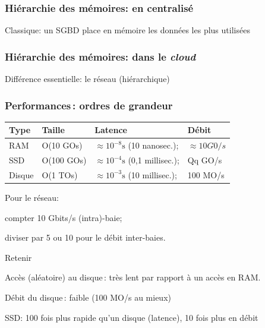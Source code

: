 

\begin{frame}
\frametitle{Hiérarchie des mémoires: en centralisé}



\vfill

Classique: un SGBD place en mémoire les données les plus utilisées
\end{frame}


\begin{frame}
\frametitle{Hiérarchie des mémoires: dans le \textit{cloud}}

Différence essentielle: le réseau (hiérarchique)

\vfill


\end{frame}

\begin{frame}
\frametitle{Performances\,: ordres de grandeur}

\begin{center}

\begin{small}

\begin{tabular}{l|p{2cm}|p{4cm}|p{3cm}}
{\bf Type} & \textbf{Taille} & {\bf Latence} & \textbf{Débit} \\
\hline
RAM & O(10 GOs) & $\approx 10^{-8} \mathrm{s}$ (10 nanosec.); & $\approx 10 G0/s$ \\ 
SSD & O(100 GOs) & $\approx 10^{-4} \mathrm{s}$ (0,1 millisec.); & Qq GO/s \\ 
Disque & O(1 TOs) & $\approx 10^{-3}\mathrm{s}$ (10 millisec.);&  100 MO/s \\ 
\hline
\end{tabular}

\end{small}
\end{center}

\vfill

Pour le réseau: 
\begin{redbullet}
  \item compter 10 Gbits/s (intra)-baie; 
  \item diviser par 5 ou 10 pour le débit inter-baies.
\end{redbullet}

\vfill

\begin{remblock}{Retenir}
\begin{redbullet}
  \item Accès (aléatoire) au disque\,: très lent par rapport à un accès en RAM.
  \item Débit du disque\,: faible (100 MO/s au mieux)
  \item SSD: 100 fois plus rapide qu'un disque (latence), 10 fois plus en débit
\end{redbullet}
\end{remblock}

\end{frame}


